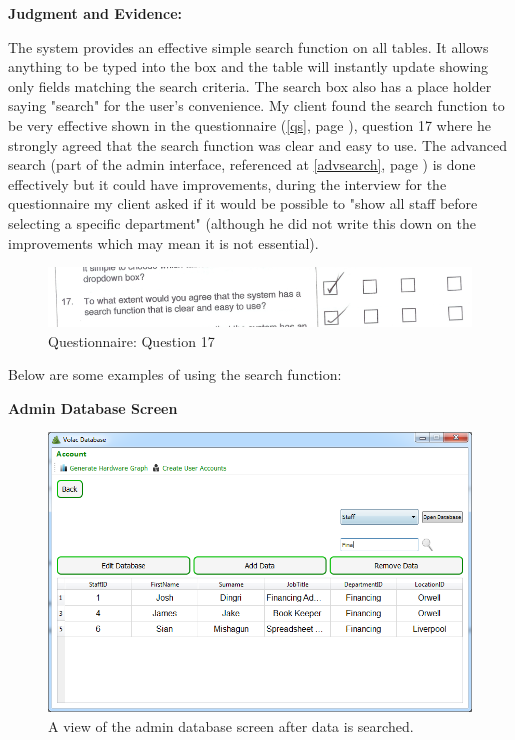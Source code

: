 \textbf{Judgment and Evidence:}

The system provides an effective simple search function on all tables. It allows anything to be typed into the box and the table will instantly update showing only fields matching the search criteria. The search box also has a place holder saying "search" for the user's convenience. My client found the search function to be very effective shown in the questionnaire (\ref{qs}, page \pageref{qs}), question 17 where he strongly agreed that the search function was clear and easy to use. The advanced search (part of the admin interface, referenced at \ref{advsearch}, page \pageref{advsearch}) is done effectively but it could have improvements, during the interview for the questionnaire my client asked if it would be possible to "show all staff before selecting a specific department" (although he did not write this down on the improvements which may mean it is not essential).

\begin{figure}[H]
    \includegraphics[width=\textwidth]{./Evaluation/EvaluationQuestionnaire/17.png}
    \caption{Questionnaire: Question 17} 
\end{figure}

Below are some examples of using the search function:

\textbf{Admin Database Screen}

\begin{figure}[H]
    \includegraphics[width=\textwidth]{./Evaluation/Images/afteradminsearch.png}
    \caption{A view of the admin database screen after data is searched.} 
\end{figure}

